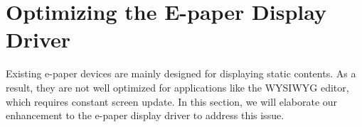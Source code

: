 \documentclass[]{sigchi}
\begin{document}




\section{Optimizing the E-paper Display Driver}\label{sect:os}
Existing e-paper devices are mainly designed for displaying static contents. As a result, they are not well optimized for applications like the WYSIWYG editor, which requires constant screen update. In this section, we will elaborate our enhancement to the e-paper display driver to address this issue. 






\end{document}
